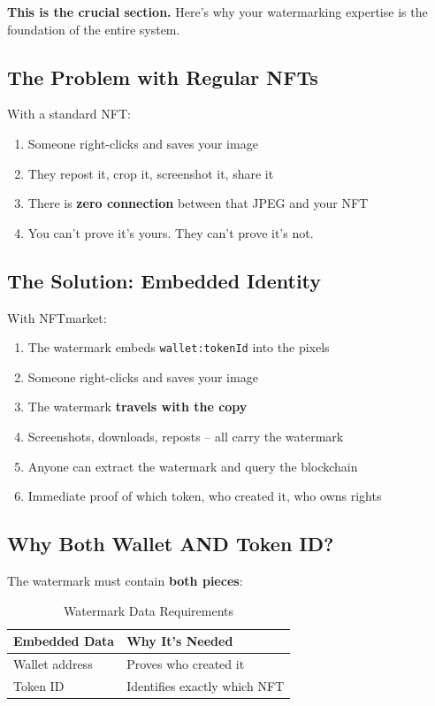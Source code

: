 \documentclass[11pt,a4paper]{article}
\newcommand{\code}[1]{\texttt{#1}}
\begin{document}
\textbf{This is the crucial section.} Here's why your watermarking expertise is the foundation of the entire system.

\subsection{The Problem with Regular NFTs}

With a standard NFT:
\begin{enumerate}
    \item Someone right-clicks and saves your image
    \item They repost it, crop it, screenshot it, share it
    \item There is \textbf{zero connection} between that JPEG and your NFT
    \item You can't prove it's yours. They can't prove it's not.
\end{enumerate}

\subsection{The Solution: Embedded Identity}

With NFTmarket:
\begin{enumerate}
    \item The watermark embeds \code{wallet:tokenId} into the pixels
    \item Someone right-clicks and saves your image
    \item The watermark \textbf{travels with the copy}
    \item Screenshots, downloads, reposts -- all carry the watermark
    \item Anyone can extract the watermark and query the blockchain
    \item Immediate proof of which token, who created it, who owns rights
\end{enumerate}

\subsection{Why Both Wallet AND Token ID?}

The watermark must contain \textbf{both pieces}:

\begin{table}[h]
\centering
\begin{tabular}{@{}ll@{}}
\toprule
\textbf{Embedded Data} & \textbf{Why It's Needed} \\
\midrule
Wallet address & Proves who created it \\
Token ID & Identifies exactly which NFT \\
\bottomrule
\end{tabular}
\caption{Watermark Data Requirements}
\end{table}
\end{document}
